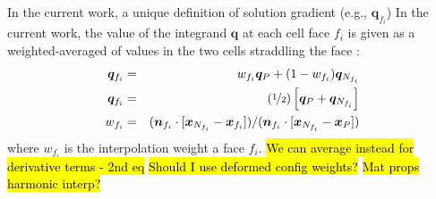 \documentclass[sn-mathphys,Numbered]{sn-jnl}%
\newcommand{\bb}{\boldsymbol}
\begin{document}
In the current work, a unique definition of solution gradient (e.g., $\bb{q}_{f_i}$)
In the current work, the value of the integrand $\bb{q}$ at each cell face $f_i$ is given as a weighted-averaged of values in the two cells straddling the face \citep{Cardiff2025JFNK, Jasak1996}:
\begin{eqnarray}
	\label{eq:face_interp}
	\bb{q}_{f_i} &=& w_{f_i} \bb{q}_P + (1 - w_{f_i}) \bb{q}_{N_{f_i}} \\
	\bb{q}_{f_i} &=& \left( \nicefrac{1}{2} \right) \left[ \bb{q}_P +  \bb{q}_{N_{f_i}} \right] \\
	\label{eq:face_interp_weights}
	w_{f_i} &=& (\bb{n}_{f_i} \cdot [\bb{x}_{N_{f_i}} - \bb{x}_{f_i}])/(\bb{n}_{f_i} \cdot [\bb{x}_{N_{f_i}} - \bb{x}_{P} ])
\end{eqnarray}
where $w_{f_i}$ is the interpolation weight a face $f_i$. %
\hl{We can average instead for derivative terms - 2nd eq}
\hl{Should I use deformed config weights?}
\hl{Mat props harmonic interp?}

\end{document}
